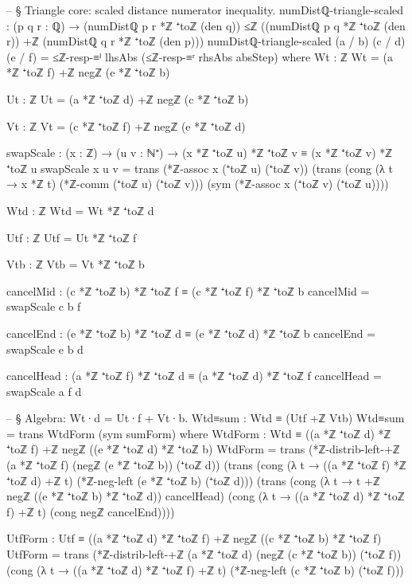 \documentclass[11pt,a4paper]{book}
\begin{document}
\begin{code}
-- § Triangle core: scaled distance numerator inequality.
numDistℚ-triangle-scaled : (p q r : ℚ) →
  (numDistℚ p r *ℤ ⁺toℤ (den q))
    ≤ℤ
  ((numDistℚ p q *ℤ ⁺toℤ (den r)) +ℤ (numDistℚ q r *ℤ ⁺toℤ (den p)))
numDistℚ-triangle-scaled (a / b) (c / d) (e / f) =
  ≤ℤ-resp-≡ˡ lhsAbs
    (≤ℤ-resp-≡ʳ rhsAbs
      absStep)
  where
    Wt : ℤ
    Wt = (a *ℤ ⁺toℤ f) +ℤ negℤ (e *ℤ ⁺toℤ b)

    Ut : ℤ
    Ut = (a *ℤ ⁺toℤ d) +ℤ negℤ (c *ℤ ⁺toℤ b)

    Vt : ℤ
    Vt = (c *ℤ ⁺toℤ f) +ℤ negℤ (e *ℤ ⁺toℤ d)

    swapScale : (x : ℤ) → (u v : ℕ⁺) → (x *ℤ ⁺toℤ u) *ℤ ⁺toℤ v ≡ (x *ℤ ⁺toℤ v) *ℤ ⁺toℤ u
    swapScale x u v =
      trans
        (*ℤ-assoc x (⁺toℤ u) (⁺toℤ v))
        (trans
          (cong (λ t → x *ℤ t) (*ℤ-comm (⁺toℤ u) (⁺toℤ v)))
          (sym (*ℤ-assoc x (⁺toℤ v) (⁺toℤ u))))

    Wtd : ℤ
    Wtd = Wt *ℤ ⁺toℤ d

    Utf : ℤ
    Utf = Ut *ℤ ⁺toℤ f

    Vtb : ℤ
    Vtb = Vt *ℤ ⁺toℤ b

    cancelMid : (c *ℤ ⁺toℤ b) *ℤ ⁺toℤ f ≡ (c *ℤ ⁺toℤ f) *ℤ ⁺toℤ b
    cancelMid = swapScale c b f

    cancelEnd : (e *ℤ ⁺toℤ b) *ℤ ⁺toℤ d ≡ (e *ℤ ⁺toℤ d) *ℤ ⁺toℤ b
    cancelEnd = swapScale e b d

    cancelHead : (a *ℤ ⁺toℤ f) *ℤ ⁺toℤ d ≡ (a *ℤ ⁺toℤ d) *ℤ ⁺toℤ f
    cancelHead = swapScale a f d

    -- § Algebra: Wt·d = Ut·f + Vt·b.
    Wtd≡sum : Wtd ≡ (Utf +ℤ Vtb)
    Wtd≡sum =
      trans WtdForm (sym sumForm)
      where
        WtdForm : Wtd ≡ ((a *ℤ ⁺toℤ d) *ℤ ⁺toℤ f) +ℤ negℤ ((e *ℤ ⁺toℤ d) *ℤ ⁺toℤ b)
        WtdForm =
          trans
            (*ℤ-distrib-left-+ℤ (a *ℤ ⁺toℤ f) (negℤ (e *ℤ ⁺toℤ b)) (⁺toℤ d))
            (trans
              (cong (λ t → ((a *ℤ ⁺toℤ f) *ℤ ⁺toℤ d) +ℤ t)
                    (*ℤ-neg-left (e *ℤ ⁺toℤ b) (⁺toℤ d)))
              (trans
                (cong (λ t → t +ℤ negℤ ((e *ℤ ⁺toℤ b) *ℤ ⁺toℤ d)) cancelHead)
                (cong (λ t → ((a *ℤ ⁺toℤ d) *ℤ ⁺toℤ f) +ℤ t)
                      (cong negℤ cancelEnd))))

        UtfForm : Utf ≡ ((a *ℤ ⁺toℤ d) *ℤ ⁺toℤ f) +ℤ negℤ ((c *ℤ ⁺toℤ b) *ℤ ⁺toℤ f)
        UtfForm =
          trans
            (*ℤ-distrib-left-+ℤ (a *ℤ ⁺toℤ d) (negℤ (c *ℤ ⁺toℤ b)) (⁺toℤ f))
            (cong (λ t → ((a *ℤ ⁺toℤ d) *ℤ ⁺toℤ f) +ℤ t)
                  (*ℤ-neg-left (c *ℤ ⁺toℤ b) (⁺toℤ f)))


\end{code}
\end{document}
